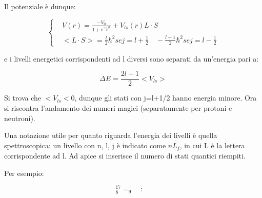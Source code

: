 \documentclass{article}
\begin{document}
Il potenziale è dunque:

\begin{equation}
    \left\{
    \begin{aligned}
         & V(r)=\frac{-V_0}{1+e^{\frac{r-R}{a}}}+V_{ls}(r)L\cdot S                                          \\
         & <L\cdot S>= \frac{l}{2}\hbar^2 se j=l+\frac{1}{2} \quad -\frac{l+1}{2}\hbar^2 se j=l-\frac{1}{2}
    \end{aligned}
    \right.
\end{equation}

e i livelli energetici corrispondenti ad l diversi sono separati da un'energia pari a:

\begin{equation}
    \Delta E= \frac{2l+1}{2}<V_{ls}>
\end{equation}

Si trova che $<V_{ls}<0$, dunque gli stati con j=l+1/2 hanno energia minore.
Ora si riscontra l'andamento dei numeri magici (separatamente per protoni e neutroni).

Una notazione utile per quanto riguarda l'energia dei livelli è quella spettroscopica:
un livello con n, l, j è indicato come $nL_j$, in cui L è la lettera corrispondente ad l.
Ad apice si inserisce il numero di stati quantici riempiti.

Per esempio:

\begin{equation}
    ^{17}_{8}=_9 \quad : \quad
\end{equation}
\end{document}
